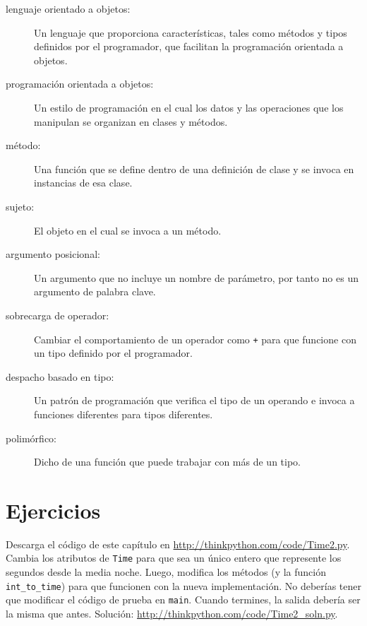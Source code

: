 \documentclass[10pt]{book}
\begin{document}
\begin{description}

\item[lenguaje orientado a objetos:] Un lenguaje que proporciona características,
  tales como métodos y tipos definidos por el programador, que facilitan
  la programación orientada a objetos.

\item[programación orientada a objetos:] Un estilo de programación en el cual
los datos y las operaciones que los manipulan se organizan en clases
y métodos.

\item[método:] Una función que se define dentro de una definición de clase y
se invoca en instancias de esa clase.

\item[sujeto:] El objeto en el cual se invoca a un método.

\item[argumento posicional:]  Un argumento que no incluye
un nombre de parámetro, por tanto no es un argumento de palabra clave.

\item[sobrecarga de operador:] Cambiar el comportamiento de un operador como
{\tt +} para que funcione con un tipo definido por el programador.

\item[despacho basado en tipo:] Un patrón de programación que verifica el tipo
de un operando e invoca a funciones diferentes para tipos diferentes.
 

\item[polimórfico:] Dicho de una función que puede trabajar con más de
  un tipo.

\end{description}


\section{Ejercicios}

\begin{exercise}

Descarga el código de este capítulo en
\url{http://thinkpython.com/code/Time2.py}.  Cambia los atributos de
    {\tt Time} para que sea un único entero que represente los segundos desde
    la media noche.  Luego, modifica los métodos (y la función
    \verb"int_to_time") para que funcionen con la nueva implementación.  No
    deberías tener que modificar el código de prueba en {\tt main}.  Cuando
    termines, la salida debería ser la misma que antes.  Solución:
    \url{http://thinkpython.com/code/Time2_soln.py}.

\end{exercise}
\end{document}
